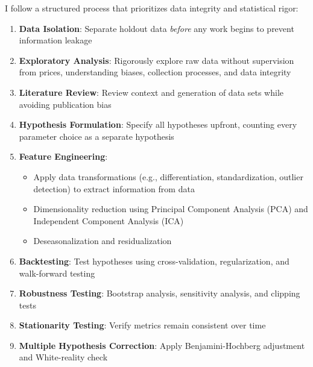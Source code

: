 \documentclass[11pt, letterpaper]{article}
\begin{document}
  I follow a structured process that prioritizes data integrity and
  statistical rigor:

  \begin{enumerate}
    \def\labelenumi{\arabic{enumi}.}

    \item \textbf{Data Isolation}: Separate holdout data \textit{before}
      any work begins to prevent information leakage

    \item \textbf{Exploratory Analysis}: Rigorously explore raw data without
      supervision from prices, understanding biases, collection processes,
      and data integrity

    \item \textbf{Literature Review}: Review context and generation of data
      sets while avoiding publication bias

    \item \textbf{Hypothesis Formulation}: Specify all hypotheses upfront,
      counting every parameter choice as a separate hypothesis

    \item \textbf{Feature Engineering}:

      \begin{itemize}
        \item Apply data transformations (e.g., differentiation, standardization,
          outlier detection) to extract information from data

        \item Dimensionality reduction using Principal Component Analysis
          (PCA) and Independent Component Analysis (ICA)

        \item Deseasonalization and residualization
      \end{itemize}

    \item \textbf{Backtesting}: Test hypotheses using cross-validation,
      regularization, and walk-forward testing

    \item \textbf{Robustness Testing}: Bootstrap analysis, sensitivity
      analysis, and clipping tests

    \item \textbf{Stationarity Testing}: Verify metrics remain consistent
      over time

    \item \textbf{Multiple Hypothesis Correction}: Apply Benjamini-Hochberg
      adjustment and White-reality check


\end{enumerate}
\end{document}
